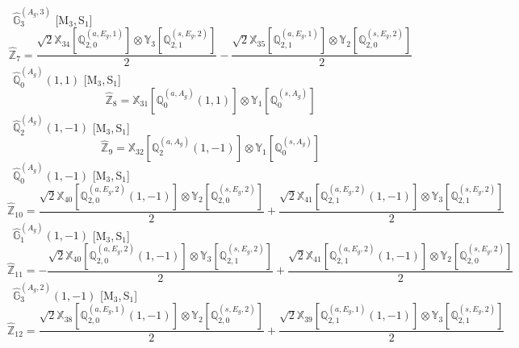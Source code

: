 \documentclass[fleqn,10pt,landscape]{article}
\begin{document}
\begin{itemize}
\vspace{4mm}
\noindent {} $\,\,\,\hat{\mathbb{G}}_{3}^{(A_{g},3)}$ [M$_{3}$,\,S$_{1}$]
\begin{dmath*}
\hat{\mathbb{Z}}_{7}=\frac{\sqrt{2} \mathbb{X}_{34}[\mathbb{Q}_{2,0}^{(a,E_{g},1)}] \otimes\mathbb{Y}_{3}[\mathbb{Q}_{2,1}^{(s,E_{g},2)}]}{2} - \frac{\sqrt{2} \mathbb{X}_{35}[\mathbb{Q}_{2,1}^{(a,E_{g},1)}] \otimes\mathbb{Y}_{2}[\mathbb{Q}_{2,0}^{(s,E_{g},2)}]}{2}
\end{dmath*}
\vspace{4mm}
\noindent {} $\,\,\,\hat{\mathbb{Q}}_{0}^{(A_{g})}(1,1)$ [M$_{3}$,\,S$_{1}$]
\begin{dmath*}
\hat{\mathbb{Z}}_{8}=\mathbb{X}_{31}[\mathbb{Q}_{0}^{(a,A_{g})}(1,1)] \otimes\mathbb{Y}_{1}[\mathbb{Q}_{0}^{(s,A_{g})}]
\end{dmath*}
\vspace{4mm}
\noindent {} $\,\,\,\hat{\mathbb{Q}}_{2}^{(A_{g})}(1,-1)$ [M$_{3}$,\,S$_{1}$]
\begin{dmath*}
\hat{\mathbb{Z}}_{9}=\mathbb{X}_{32}[\mathbb{Q}_{2}^{(a,A_{g})}(1,-1)] \otimes\mathbb{Y}_{1}[\mathbb{Q}_{0}^{(s,A_{g})}]
\end{dmath*}
\vspace{4mm}
\noindent {} $\,\,\,\hat{\mathbb{Q}}_{0}^{(A_{g})}(1,-1)$ [M$_{3}$,\,S$_{1}$]
\begin{dmath*}
\hat{\mathbb{Z}}_{10}=\frac{\sqrt{2} \mathbb{X}_{40}[\mathbb{Q}_{2,0}^{(a,E_{g},2)}(1,-1)] \otimes\mathbb{Y}_{2}[\mathbb{Q}_{2,0}^{(s,E_{g},2)}]}{2} + \frac{\sqrt{2} \mathbb{X}_{41}[\mathbb{Q}_{2,1}^{(a,E_{g},2)}(1,-1)] \otimes\mathbb{Y}_{3}[\mathbb{Q}_{2,1}^{(s,E_{g},2)}]}{2}
\end{dmath*}
\vspace{4mm}
\noindent {} $\,\,\,\hat{\mathbb{G}}_{1}^{(A_{g})}(1,-1)$ [M$_{3}$,\,S$_{1}$]
\begin{dmath*}
\hat{\mathbb{Z}}_{11}=- \frac{\sqrt{2} \mathbb{X}_{40}[\mathbb{Q}_{2,0}^{(a,E_{g},2)}(1,-1)] \otimes\mathbb{Y}_{3}[\mathbb{Q}_{2,1}^{(s,E_{g},2)}]}{2} + \frac{\sqrt{2} \mathbb{X}_{41}[\mathbb{Q}_{2,1}^{(a,E_{g},2)}(1,-1)] \otimes\mathbb{Y}_{2}[\mathbb{Q}_{2,0}^{(s,E_{g},2)}]}{2}
\end{dmath*}
\vspace{4mm}
\noindent {} $\,\,\,\hat{\mathbb{G}}_{3}^{(A_{g},2)}(1,-1)$ [M$_{3}$,\,S$_{1}$]
\begin{dmath*}
\hat{\mathbb{Z}}_{12}=\frac{\sqrt{2} \mathbb{X}_{38}[\mathbb{Q}_{2,0}^{(a,E_{g},1)}(1,-1)] \otimes\mathbb{Y}_{2}[\mathbb{Q}_{2,0}^{(s,E_{g},2)}]}{2} + \frac{\sqrt{2} \mathbb{X}_{39}[\mathbb{Q}_{2,1}^{(a,E_{g},1)}(1,-1)] \otimes\mathbb{Y}_{3}[\mathbb{Q}_{2,1}^{(s,E_{g},2)}]}{2}

\end{dmath*}
\end{itemize}
\end{document}
